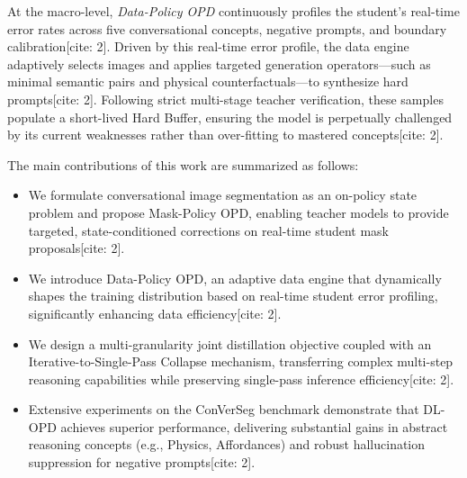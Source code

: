 At the macro-level, \textit{Data-Policy OPD} continuously profiles the student's real-time error rates across five conversational concepts, negative prompts, and boundary calibration[cite: 2]. Driven by this real-time error profile, the data engine adaptively selects images and applies targeted generation operators—such as minimal semantic pairs and physical counterfactuals—to synthesize hard prompts[cite: 2]. Following strict multi-stage teacher verification, these samples populate a short-lived Hard Buffer, ensuring the model is perpetually challenged by its current weaknesses rather than over-fitting to mastered concepts[cite: 2].

The main contributions of this work are summarized as follows:
\begin{itemize}
    \item We formulate conversational image segmentation as an on-policy state problem and propose Mask-Policy OPD, enabling teacher models to provide targeted, state-conditioned corrections on real-time student mask proposals[cite: 2].
    \item We introduce Data-Policy OPD, an adaptive data engine that dynamically shapes the training distribution based on real-time student error profiling, significantly enhancing data efficiency[cite: 2].
    \item We design a multi-granularity joint distillation objective coupled with an Iterative-to-Single-Pass Collapse mechanism, transferring complex multi-step reasoning capabilities while preserving single-pass inference efficiency[cite: 2].
    \item Extensive experiments on the ConVerSeg benchmark demonstrate that DL-OPD achieves superior performance, delivering substantial gains in abstract reasoning concepts (e.g., Physics, Affordances) and robust hallucination suppression for negative prompts[cite: 2].
\end{itemize}



